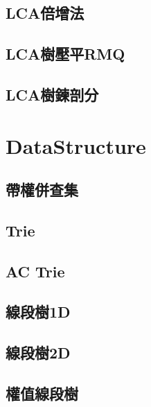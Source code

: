     \subsection{LCA倍增法}
    \subsection{LCA樹壓平RMQ}
        
    \subsection{LCA樹鍊剖分}
        

\section{DataStructure}
    \subsection{帶權併查集}
    \subsection{Trie}
    \subsection{AC Trie}
    \subsection{線段樹1D}
    \subsection{線段樹2D}
    \subsection{權值線段樹}
